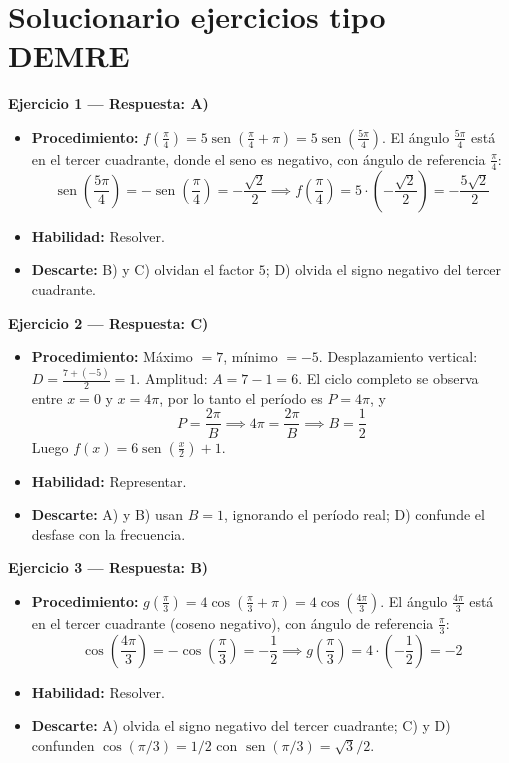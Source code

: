\documentclass[12pt,letterpaper]{article}
\providecommand{\sen}{\operatorname{sen}}
\begin{document}
\newpage
\section{Solucionario ejercicios tipo DEMRE}

\textbf{Ejercicio 1 --- Respuesta: A)}
\begin{itemize}[leftmargin=*]
    \item \textbf{Procedimiento:} $f\left(\frac{\pi}{4}\right)=5\sen\left(\frac{\pi}{4}+\pi\right)=5\sen\left(\frac{5\pi}{4}\right)$. El ángulo $\frac{5\pi}{4}$ está en el tercer cuadrante, donde el seno es negativo, con ángulo de referencia $\frac{\pi}{4}$:
          \[ \sen\left(\frac{5\pi}{4}\right)=-\sen\left(\frac{\pi}{4}\right)=-\frac{\sqrt2}{2} \implies f\left(\frac{\pi}{4}\right)=5\cdot\left(-\frac{\sqrt2}{2}\right)=-\frac{5\sqrt2}{2} \]
    \item \textbf{Habilidad:} Resolver.
    \item \textbf{Descarte:} B) y C) olvidan el factor $5$; D) olvida el signo negativo del tercer cuadrante.
\end{itemize}

\vspace{1.2cm}

\textbf{Ejercicio 2 --- Respuesta: C)}
\begin{itemize}[leftmargin=*]
    \item \textbf{Procedimiento:} Máximo $=7$, mínimo $=-5$. Desplazamiento vertical: $D=\frac{7+(-5)}{2}=1$. Amplitud: $A=7-1=6$. El ciclo completo se observa entre $x=0$ y $x=4\pi$, por lo tanto el período es $P=4\pi$, y
          \[ P=\frac{2\pi}{B} \implies 4\pi=\frac{2\pi}{B} \implies B=\frac12 \]
          Luego $f(x)=6\sen\left(\frac{x}{2}\right)+1$.
    \item \textbf{Habilidad:} Representar.
    \item \textbf{Descarte:} A) y B) usan $B=1$, ignorando el período real; D) confunde el desfase con la frecuencia.
\end{itemize}

\vspace{1.2cm}

\textbf{Ejercicio 3 --- Respuesta: B)}
\begin{itemize}[leftmargin=*]
    \item \textbf{Procedimiento:} $g\left(\frac{\pi}{3}\right)=4\cos\left(\frac{\pi}{3}+\pi\right)=4\cos\left(\frac{4\pi}{3}\right)$. El ángulo $\frac{4\pi}{3}$ está en el tercer cuadrante (coseno negativo), con ángulo de referencia $\frac{\pi}{3}$:
          \[ \cos\left(\frac{4\pi}{3}\right)=-\cos\left(\frac{\pi}{3}\right)=-\frac12 \implies g\left(\frac{\pi}{3}\right)=4\cdot\left(-\frac12\right)=-2 \]
    \item \textbf{Habilidad:} Resolver.
    \item \textbf{Descarte:} A) olvida el signo negativo del tercer cuadrante; C) y D) confunden $\cos(\pi/3)=1/2$ con $\sen(\pi/3)=\sqrt3/2$.
\end{itemize}
\end{document}

